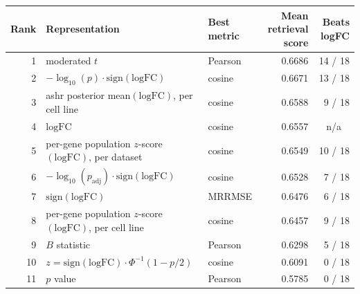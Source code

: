 \begin{table}[t]
\label{tab:cross_dataset_retrieval_representation_ranking_min_support}
\centering
\footnotesize
\setlength{\tabcolsep}{6pt}
\begin{tabular}{rllrr}
\toprule
Rank & Representation & Best metric & Mean retrieval score & Beats logFC \\
\midrule
1 & moderated $t$ & Pearson & 0.6686 & 14 / 18 \\
2 & $-\log_{10}(p)\cdot\mathrm{sign}(\mathrm{logFC})$ & cosine & 0.6671 & 13 / 18 \\
3 & ashr posterior mean$(\mathrm{logFC})$, per cell line & cosine & 0.6588 & 9 / 18 \\
4 & $\mathrm{logFC}$ & cosine & 0.6557 & \multicolumn{1}{c}{n/a} \\
5 & per-gene population $z$-score$(\mathrm{logFC})$, per dataset & cosine & 0.6549 & 10 / 18 \\
6 & $-\log_{10}(p_{\mathrm{adj}})\cdot\mathrm{sign}(\mathrm{logFC})$ & cosine & 0.6528 & 7 / 18 \\
7 & $\mathrm{sign}(\mathrm{logFC})$ & MRRMSE & 0.6476 & 6 / 18 \\
8 & per-gene population $z$-score$(\mathrm{logFC})$, per cell line & cosine & 0.6457 & 9 / 18 \\
9 & $B$ statistic & Pearson & 0.6298 & 5 / 18 \\
10 & $z=\mathrm{sign}(\mathrm{logFC})\cdot\Phi^{-1}(1-p/2)$ & cosine & 0.6091 & 0 / 18 \\
11 & $p$ value & Pearson & 0.5785 & 0 / 18 \\
\bottomrule
\end{tabular}
\end{table}
